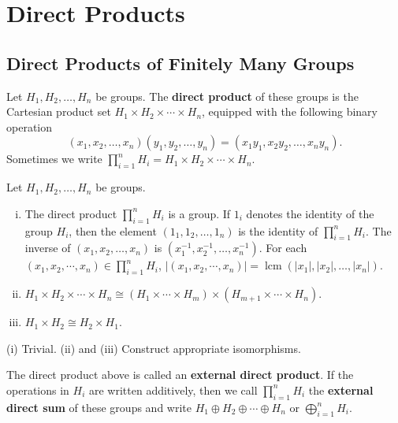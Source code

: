 \section{Direct Products}
\subsection{Direct Products of Finitely Many Groups}
\begin{definition}
	Let $H_1, H_2, \ldots, H_n$ be groups. The \textbf{direct product} of these groups is the Cartesian product set $H_1 \times H_2 \times \cdots \times H_n$, equipped with the following binary operation
	\begin{equation*}
		(x_1, x_2, \ldots, x_n)(y_1, y_2, \ldots, y_n) = (x_1 y_1, x_2 y_2, \ldots, x_n y_n).
	\end{equation*}
	Sometimes we write $\prod_{i=1}^n H_i = H_1 \times H_2 \times \cdots \times H_n$.
\end{definition}
\begin{proposition}Let $H_1, H_2, \ldots, H_n$ be groups.
	\begin{enumerate}[(i)]
		\item The direct product $\prod_{i=1}^n H_i$ is a group. If $1_i$ denotes the identity of the group $H_i$, then the element $(1_1, 1_2, \ldots, 1_n)$ is the identity of $\prod_{i=1}^n H_i$. The inverse of $(x_1, x_2, \ldots, x_n)$ is $(x_1^{-1}, x_2^{-1}, \ldots, x_n^{-1})$. For each $(x_1,x_2,\cdots, x_n) \in\prod_{i=1}^n H_i$, $|(x_1,x_2,\cdots, x_n)| = \operatorname{lcm}(|x_1|,|x_2|,\dots, |x_n|)$.
		\item $H_1 \times H_2 \times \cdots \times H_n \cong (H_1 \times \cdots \times H_m) \times (H_{m+1} \times \cdots \times H_n)$.
		\item $H_1\times H_2 \cong H_2 \times H_1$.
	\end{enumerate}
\end{proposition}
\begin{sketch}
	(i) Trivial. (ii) and (iii) Construct appropriate isomorphisms.
\end{sketch}
\begin{definition}
	The direct product above is called an \textbf{external direct product}. If the operations in $H_i$ are written additively, then we call $\prod_{i=1}^n H_i$ the \textbf{external direct sum} of these groups and write $H_1\oplus H_2 \oplus \cdots \oplus H_n$ or $\bigoplus_{i=1}^n H_i$.
\end{definition}
